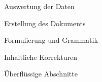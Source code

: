 \begin{changelog}[author=Gomoll ,sectioncmd=\subsection*]
    \begin{version}[v=1.0, date=2024-12-16]
        \added 
            \item Auswertung der Daten
            \item Erstellung des Dokuments
        \fixed
            \item Formulierung und Grammatik
            \item Inhaltliche Korrekturen
        \removed
            \item Überflüssige Abschnitte
    \end{version}
\end{changelog}